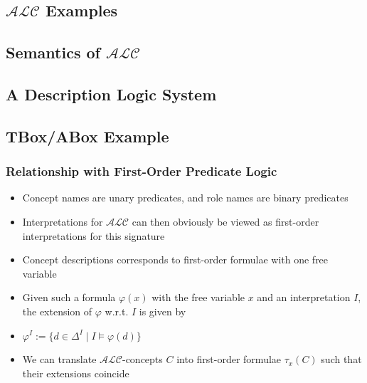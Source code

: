 \documentclass[conference, a4paper]{styles/acmsiggraph}
\begin{document}
    \subsection{$\mathcal{ALC}$ Examples}
    \subsection{Semantics of $\mathcal{ALC}$}
    \subsection{A Description Logic System}
    \subsection{TBox/ABox Example}
    
        
        
    
    
        
        
        \subsubsection{Relationship with First-Order Predicate Logic}
            \begin{itemize}
                \item Concept names are unary predicates, and role names are binary predicates
                \item Interpretations for $\mathcal{ALC}$ can then obviously be viewed as first-order interpretations for this signature
                \item Concept descriptions corresponds to first-order formulae with one free variable
                \item Given such a formula $\varphi(x)$ with the free variable $x$ and an interpretation $I$, the extension of $\varphi$ w.r.t. $I$ is given by
                \item $\varphi^I := \{d \in \Delta^I \mid I \vDash \varphi(d)\}$
                \item We can translate $\mathcal{ALC}$-concepts $C$ into first-order formulae $\tau_x(C)$ such that their extensions coincide
            \end{itemize}
        
\end{document}

